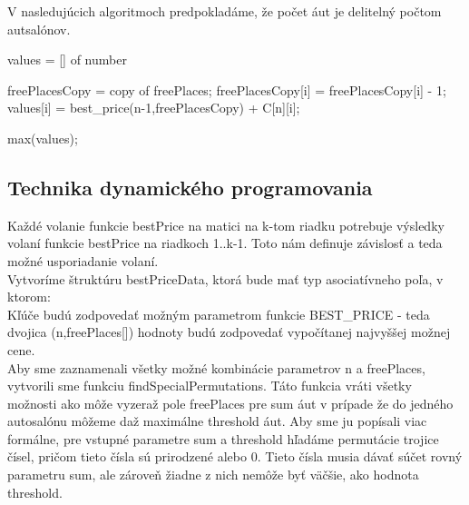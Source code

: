 \documentclass[paper=a4, fontsize=11pt]{scrartcl} %
\numberwithin{equation}{section} %
\numberwithin{figure}{section} %
\numberwithin{table}{section} %
\begin{document}
V nasledujúcich algoritmoch predpokladáme, že počet áut je delitelný počtom autsalónov. \ \\

\begin{algorithmic}[1]
        \State {}
    \EndIf

    \State values = [] of number

            \State freePlacesCopy = copy of freePlaces;			
            \State	freePlacesCopy[i] = freePlacesCopy[i] - 1;			
            \State values[i] = best\_price(n-1,freePlacesCopy) + C[n][i];
        \EndIf
    \EndFor

    \State \Return max(values);
\EndFunction
\end{algorithmic}

\subsection*{Technika dynamického programovania}

Každé volanie funkcie bestPrice na matici na k-tom riadku potrebuje  výsledky volaní funkcie bestPrice na riadkoch 1..k-1. Toto nám definuje závislosť  a teda možné usporiadanie volaní. \\

Vytvoríme štruktúru bestPriceData, ktorá  bude mať typ asociatívneho poľa, v ktorom: \\
Kľúče budú zodpovedať možným parametrom funkcie BEST\_PRICE - teda dvojica (n,freePlaces[])
hodnoty budú zodpovedať vypočítanej najvyššej možnej cene. \\


Aby sme zaznamenali všetky možné kombinácie parametrov n a freePlaces, vytvorili sme funkciu findSpecialPermutations. Táto funkcia vráti všetky možnosti ako môže vyzeraž pole freePlaces pre sum áut v prípade že do jedného autosalónu môžeme daž maximálne threshold áut. 
Aby sme ju popísali viac formálne, pre vstupné parametre sum a threshold hľadáme permutácie trojice čísel, pričom tieto čísla sú prirodzené alebo 0. Tieto čísla musia dávať súčet rovný parametru sum, ale zároveň žiadne z nich nemôže byť väčšie, ako hodnota threshold. \ \\
\end{document}

